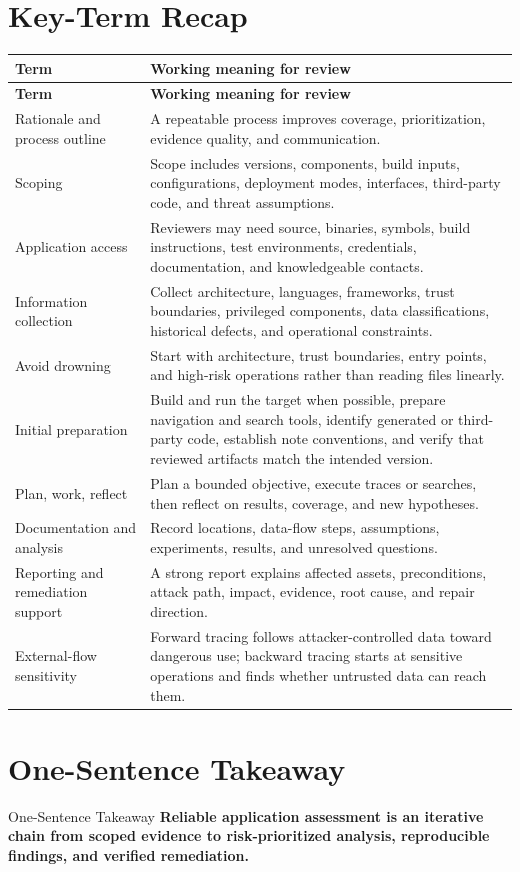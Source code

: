 \documentclass[11pt,letterpaper]{article}
\begin{document}
\section{Key-Term Recap}
\begin{longtable}{>{\raggedright\arraybackslash}p{}p{}}
\toprule
\textbf{Term} & \textbf{Working meaning for review} \\
\midrule
\endfirsthead
\toprule
\textbf{Term} & \textbf{Working meaning for review} \\
\midrule
\endhead
Rationale and process outline & A repeatable process improves coverage, prioritization, evidence quality, and communication. \\
Scoping & Scope includes versions, components, build inputs, configurations, deployment modes, interfaces, third-party code, and threat assumptions. \\
Application access & Reviewers may need source, binaries, symbols, build instructions, test environments, credentials, documentation, and knowledgeable contacts. \\
Information collection & Collect architecture, languages, frameworks, trust boundaries, privileged components, data classifications, historical defects, and operational constraints. \\
Avoid drowning & Start with architecture, trust boundaries, entry points, and high-risk operations rather than reading files linearly. \\
Initial preparation & Build and run the target when possible, prepare navigation and search tools, identify generated or third-party code, establish note conventions, and verify that reviewed artifacts match the intended version. \\
Plan, work, reflect & Plan a bounded objective, execute traces or searches, then reflect on results, coverage, and new hypotheses. \\
Documentation and analysis & Record locations, data-flow steps, assumptions, experiments, results, and unresolved questions. \\
Reporting and remediation support & A strong report explains affected assets, preconditions, attack path, impact, evidence, root cause, and repair direction. \\
External-flow sensitivity & Forward tracing follows attacker-controlled data toward dangerous use; backward tracing starts at sensitive operations and finds whether untrusted data can reach them. \\
\bottomrule
\end{longtable}
\section{One-Sentence Takeaway}
\begin{CornellExamBox}{One-Sentence Takeaway}
\textbf{Reliable application assessment is an iterative chain from scoped evidence to risk-prioritized analysis, reproducible findings, and verified remediation.}
\end{CornellExamBox}
\end{document}

